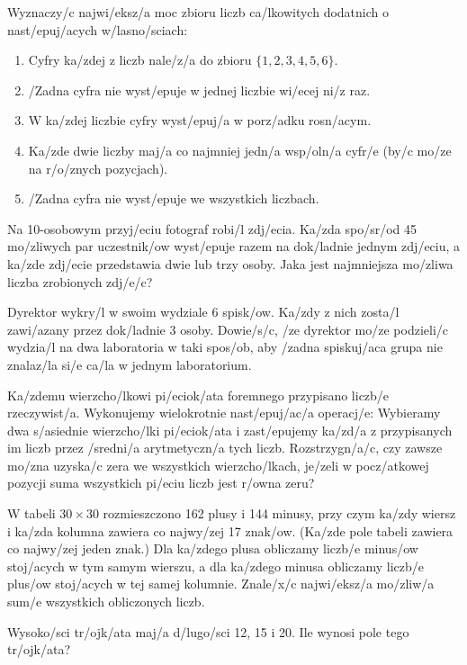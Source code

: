 \documentclass{bw06}
\begin{document}
\begin{problems}
\item 
Wyznaczy/c najwi/eksz/a moc zbioru liczb ca/lkowitych dodatnich o nast/epuj/acych w/lasno/sciach:
\begin{enumerate}
\item Cyfry ka/zdej z liczb nale/z/a do zbioru $\{1,2,3,4,5,6\}$.
\item /Zadna cyfra nie wyst/epuje w jednej liczbie wi/ecej ni/z raz.
\item W ka/zdej liczbie cyfry wyst/epuj/a w porz/adku rosn/acym.
\item Ka/zde dwie liczby maj/a co najmniej jedn/a wsp/oln/a cyfr/e (by/c mo/ze na r/o/znych pozycjach).
\item /Zadna cyfra nie wyst/epuje we wszystkich liczbach.
\end{enumerate}

\item 
Na 10-osobowym przyj/eciu fotograf robi/l zdj/ecia. 
Ka/zda spo/sr/od 45 mo/zliwych par uczestnik/ow wyst/epuje razem na dok/ladnie jednym zdj/eciu, a ka/zde zdj/ecie
przedstawia dwie lub trzy osoby. Jaka jest najmniejsza mo/zliwa liczba zrobionych zdj/e/c?

\item
Dyrektor wykry/l w swoim wydziale 6 spisk/ow. Ka/zdy z nich zosta/l zawi/azany przez dok/ladnie 3 osoby. 
Dowie/s/c, /ze dyrektor mo/ze podzieli/c wydzia/l na dwa laboratoria w taki spos/ob, 
aby /zadna spiskuj/aca grupa nie znalaz/la si/e ca/la w jednym laboratorium.

\item
Ka/zdemu wierzcho/lkowi pi/eciok/ata foremnego przypisano liczb/e rzeczywist/a. Wykonujemy wielokrotnie
nast/epuj/ac/a operacj/e: Wybieramy dwa s/asiednie wierzcho/lki pi/eciok/ata i zast/epujemy ka/zd/a
z przypisanych im liczb przez /sredni/a arytmetyczn/a tych liczb. Rozstrzygn/a/c, czy zawsze mo/zna
uzyska/c zera we wszystkich wierzcho/lkach, je/zeli w pocz/atkowej pozycji suma wszystkich pi/eciu liczb
jest r/owna zeru?

\item W tabeli $30\times 30$ rozmieszczono 162 plusy i 144 minusy, przy czym ka/zdy wiersz i ka/zda kolumna
zawiera co najwy/zej 17 znak/ow. (Ka/zde pole tabeli zawiera co najwy/zej jeden znak.)
Dla ka/zdego plusa obliczamy liczb/e minus/ow stoj/acych w tym samym wierszu,
a dla ka/zdego minusa obliczamy liczb/e plus/ow stoj/acych w tej samej kolumnie.
Znale/x/c najwi/eksz/a mo/zliw/a sum/e wszystkich obliczonych liczb.

\item Wysoko/sci tr/ojk/ata maj/a d/lugo/sci 12, 15 i 20. Ile wynosi pole tego tr/ojk/ata?


\end{problems}
\end{document}

